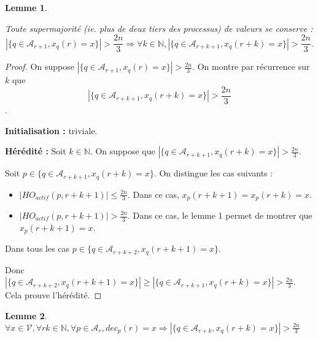 \documentclass{article}
\newtheorem{lemma}{Lemme}[section]
\begin{document}
\begin{lemma}\label{lem:supcons}

Toute supermajorité (ie. plus de deux tiers des processus) de valeurs se conserve :
	$$ | \{ q \in \mathcal{A}_{r+1} , x_q(r) = x \} | > 
	\frac{2 n}{3} \Rightarrow \forall k \in \mathds{N}, | \{ q \in \mathcal{A}_{r+k+1} , x_q(r+k) = x \} | > \frac{2 n}{3} . $$

\end{lemma}

\begin{proof}

	On suppose $| \{ q \in \mathcal{A}_{r+1} , x_q(r) = x \} | > \frac{2 n}{3}$. On montre par récurrence sur $k$ que
	$$| \{ q \in \mathcal{A}_{r+k+1} , x_q(r+k) = x \} | > \frac{2 n}{3}$$.

	\textbf{Initialisation :} triviale.

	\textbf{Hérédité :}
	Soit $k \in \mathds{N}$. On suppose que 
	$| \{ q \in \mathcal{A}_{r+k+1} , x_q(r+k) = x \} | > \frac{2 n}{3}$.

	Soit $p \in  \{ q \in \mathcal{A}_{r+k+1} , x_q(r+k) = x \} $. On distingue les cas suivants :

	\begin{itemize}

		\item $|HO_{actif} (p, r+k+1) | \leq \frac{2 n}{3}$. Dans ce cas, $x_p(r+k+1) = x_p(r+k) = x$.
		\item $|HO_{actif} (p, r+k+1) | > \frac{2 n}{3}$. Dans ce cas, le lemme 1 permet de montrer que $x_p(r+k+1) = x$.

	\end{itemize}

	Dans tous les cas $p \in \{ q \in \mathcal{A}_{r+k+2} , x_q(r+k+1) = x \} $. 

	Donc $| \{ q \in \mathcal{A}_{r+k+2} , x_q(r+k+1) = x \} | \geq | \{ q \in \mathcal{A}_{r+k+1} , x_q(r+k) = x \} | > \frac{2 n}{3}$.
	Cela prouve l'hérédité.
\end{proof}
\begin{lemma}
	$\forall x \in \mathcal{V}, \forall r k \in \mathds{N}, \forall p \in \mathcal{A}_r, dec_p(r) = x \Rightarrow| \{ q \in \mathcal{A}_{r+k} , x_q(r+k) = x \} | > \frac{2 n}{3}$
\end{lemma}
\end{document}
